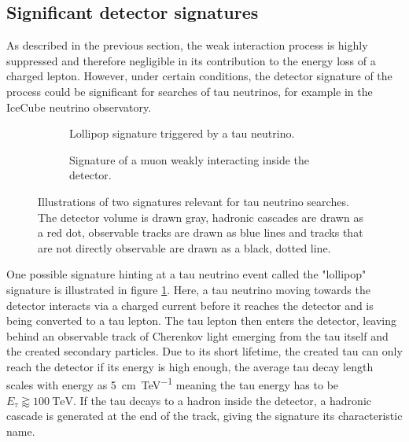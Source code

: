 \subsection{Significant detector signatures}
\label{sec:weak_signature}

As described in the previous section, the weak interaction process is highly suppressed and therefore negligible in its contribution to the energy loss of a charged lepton.
However, under certain conditions, the detector signature of the process could be significant for searches of tau neutrinos, for example in the IceCube neutrino observatory.

\begin{figure}
    \centering
    \begin{subfigure}{0.46\textwidth}
        \centering
        
        \caption{Lollipop signature triggered by a tau neutrino.}
        \label{fig:lollipop_signature}
    \end{subfigure}%
    \hspace{0.06\textwidth}%
    \begin{subfigure}{0.46\textwidth}
        \centering
        
        \caption{Signature of a muon weakly interacting inside the detector.}
        \label{fig:weak_signature}
    \end{subfigure}
    \caption{Illustrations of two signatures relevant for tau neutrino searches. The detector volume is drawn gray, hadronic cascades are drawn as a red dot, observable tracks are drawn as blue lines and tracks that are not directly observable are drawn as a black, dotted line.}
    \label{fig:test}
\end{figure}

One possible signature hinting at a tau neutrino event called the "lollipop" signature is illustrated in figure \ref{fig:lollipop_signature}.
Here, a tau neutrino moving towards the detector interacts via a charged current before it reaches the detector and is being converted to a tau lepton.
The tau lepton then enters the detector, leaving behind an observable track of Cherenkov light emerging from the tau itself and the created secondary particles.
Due to its short lifetime, the created tau can only reach the detector if its energy is high enough, the average tau decay length scales with energy as \SI{5}{\cm\per\tera\electronvolt} \cite{Aartsen_2016} meaning the tau energy has to be $E_{\tau} \gtrapprox \SI{100}{\tera\electronvolt}$.
If the tau decays to a hadron inside the detector, a hadronic cascade is generated at the end of the track, giving the signature its characteristic name. 

